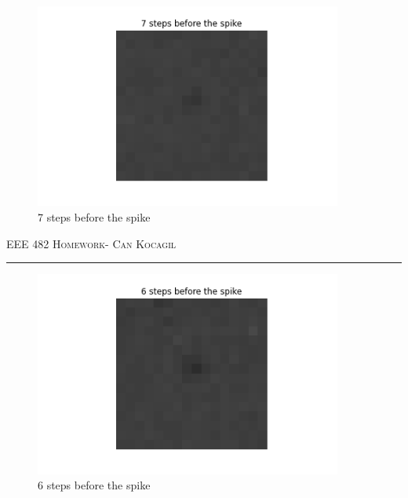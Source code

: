 \documentclass[12pt]{amsart}
\begin{document}
\begin{figure}[h]
    \centering
    \includegraphics[width = 0.9\textwidth]{images/7.png}
    \caption{7 steps before the spike}
\end{figure}


\newpage
{\scshape EEE 482} \hfill {\scshape \large  Homework-\relax} \hfill {\scshape Can Kocagil}
\smallskip
\hrule
\vspace{2mm}

\begin{figure}[h]
    \centering
    \includegraphics[width = 0.9\textwidth]{images/6.png}
    \caption{6 steps before the spike}
\end{figure}
\end{document}
